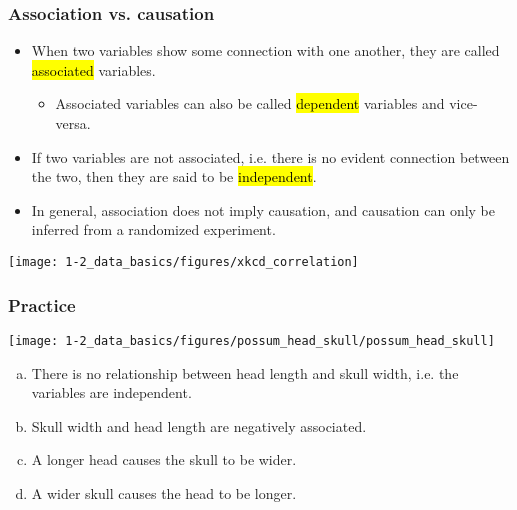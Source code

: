 
\begin{frame}
\frametitle{Association vs. causation}

\begin{itemize}

\item When two variables show some connection with one another, they are called \hl{associated} variables.
\begin{itemize}
\item Associated variables can also be called \hl{dependent} variables and vice-versa.
\end{itemize}

\item If two variables are not associated, i.e. there is no evident connection between the two, then they are said to be \hl{independent}.

\item In general, association does not imply causation, and causation can only be inferred from a randomized experiment.

\end{itemize}

\begin{center}
\texttt{[image: 1-2\_data\_basics/figures/xkcd\_correlation]} \\
{\tiny {}}
\end{center}

\end{frame}


\begin{frame}
\frametitle{Practice}

{
}
{
\texttt{[image: 1-2\_data\_basics/figures/possum\_head\_skull/possum\_head\_skull]}
}

\begin{enumerate}[(a)]
\item There is no relationship between head length and skull width, i.e. the variables are independent.
\item Skull width and head length are negatively associated.
\item A longer head causes the skull to be wider.
\item A wider skull causes the head to be longer.
\end{enumerate}

\end{frame}


